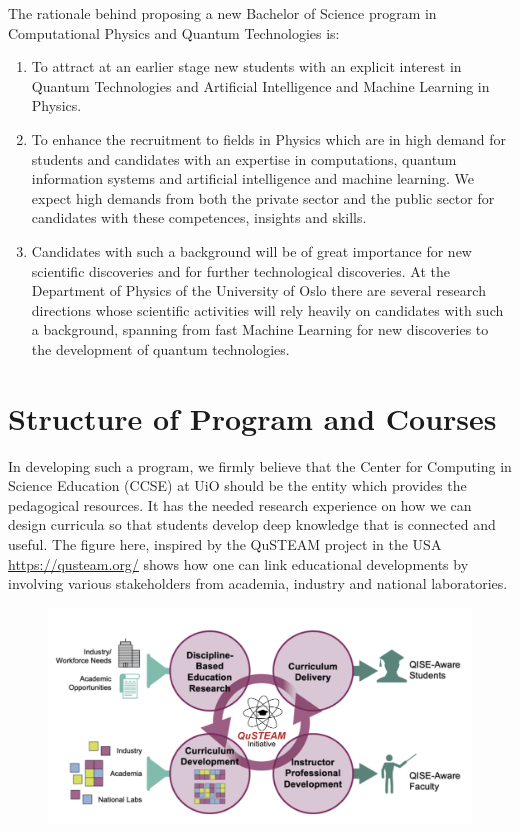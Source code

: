 \documentclass[aps,rmp,preprint,amsmath,amssymb,graphicx,longbibliography]{revtex4-1}
\begin{document}
The rationale behind proposing a new Bachelor of Science program in Computational Physics and Quantum Technologies is:
\begin{enumerate}
    \item To attract at an earlier stage new students with an explicit interest in Quantum Technologies and Artificial Intelligence and Machine Learning in Physics. 
    \item To enhance the recruitment to fields in Physics which are in high demand for students and candidates with an expertise in computations, quantum information systems and artificial intelligence and machine learning. We expect high demands from both the private sector and the public sector for candidates with these competences, insights and skills.
    \item Candidates with such a background will be of great importance for new scientific discoveries and for further technological discoveries. At the Department of Physics of the University of Oslo there are several research directions whose scientific activities will rely heavily on candidates with such a background, spanning from fast Machine Learning for new discoveries to the development of quantum technologies.   
\end{enumerate}


\section{Structure of Program and Courses}

In developing such a program, we firmly believe that 
the Center for Computing in Science Education (CCSE) at UiO should be the entity which provides the pedagogical resources. It has the needed research experience
on how we can design curricula so that students develop deep knowledge that is connected and useful.
The figure here, inspired by the QuSTEAM project in the USA \url{https://qusteam.org/}
shows how one can link educational developments by involving various stakeholders from academia, industry and national laboratories. 
\begin{figure}[!htb]
\includegraphics[width=1.0\linewidth]{qusteam.png}
\end{figure}
\end{document}
